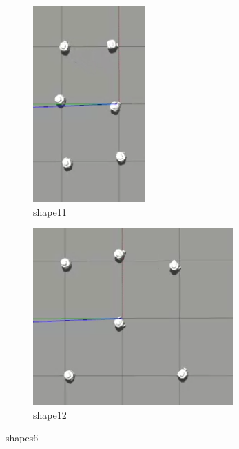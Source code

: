 \documentclass[12pt]{extarticle}
\begin{document}
\begin{figure}
\centering
\begin{subfigure}{.5\textwidth}
  \centering
  \includegraphics[width=.7\linewidth]{shape11}
  \caption{shape11}
  \label{fig:sub1}
\end{subfigure}%
\begin{subfigure}{.5\textwidth}
  \centering
  \includegraphics[width=.8\linewidth]{shape12}
  \caption{shape12}
  \label{fig:sub2}
\end{subfigure}
\caption{shapes6}
\label{fig:test}



\end{figure}
\end{document}
